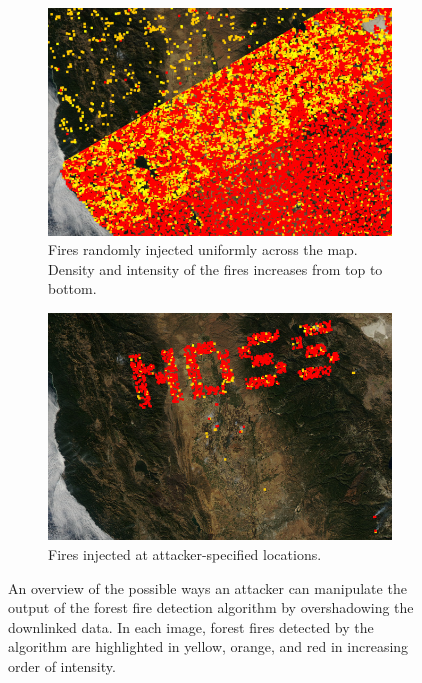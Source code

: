 \begin{figure}
\begin{subfigure}{0.49\textwidth}
        \includegraphics[width=\textwidth]{diagrams/injection/random_combined_diagonal.jpg}
        \caption{Fires randomly injected uniformly across the map. Density and intensity of the fires increases from top to bottom.}
        \label{fig:injection-random}
    \end{subfigure}
    \begin{subfigure}{0.49\textwidth}
        \centering
        \includegraphics[width=\textwidth]{diagrams/injection/pixels_800_140.jpg}
        \caption{Fires injected at attacker-specified locations.\newline}
        \label{fig:injection-logo}
    \end{subfigure}
    \caption{An overview of the possible ways an attacker can manipulate the output of the forest fire detection algorithm by overshadowing the downlinked data. In each image, forest fires detected by the algorithm are highlighted in yellow, orange, and red in increasing order of intensity.}
    \label{fig:injection}
\end{figure}

